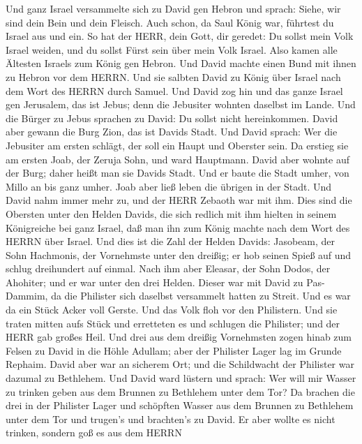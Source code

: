  Und ganz Israel versammelte sich zu David gen Hebron und
sprach: Siehe, wir sind dein Bein und dein Fleisch.  Auch
schon, da Saul König war, führtest du Israel aus und ein. So hat der
HERR, dein Gott, dir geredet: Du sollst mein Volk Israel weiden, und du
sollst Fürst sein über mein Volk Israel.  Also kamen alle
Ältesten Israels zum König gen Hebron. Und David machte einen Bund mit
ihnen zu Hebron vor dem HERRN. Und sie salbten David zu König über
Israel nach dem Wort des HERRN durch Samuel.  Und David zog
hin und das ganze Israel gen Jerusalem, das ist Jebus; denn die
Jebusiter wohnten daselbst im Lande.  Und die Bürger zu
Jebus sprachen zu David: Du sollst nicht hereinkommen. David aber gewann
die Burg Zion, das ist Davids Stadt.  Und David sprach: Wer
die Jebusiter am ersten schlägt, der soll ein Haupt und Oberster sein.
Da erstieg sie am ersten Joab, der Zeruja Sohn, und ward Hauptmann.
 David aber wohnte auf der Burg; daher heißt man sie Davids
Stadt.  Und er baute die Stadt umher, von Millo an bis ganz
umher. Joab aber ließ leben die übrigen in der Stadt.  Und
David nahm immer mehr zu, und der HERR Zebaoth war mit ihm.
 Dies sind die Obersten unter den Helden Davids, die sich
redlich mit ihm hielten in seinem Königreiche bei ganz Israel, daß man
ihn zum König machte nach dem Wort des HERRN über Israel. 
Und dies ist die Zahl der Helden Davids: Jasobeam, der Sohn Hachmonis,
der Vornehmste unter den dreißig; er hob seinen Spieß auf und schlug
dreihundert auf einmal.  Nach ihm aber Eleasar, der Sohn
Dodos, der Ahohiter; und er war unter den drei Helden. 
Dieser war mit David zu Pas-Dammim, da die Philister sich daselbst
versammelt hatten zu Streit. Und es war da ein Stück Acker voll Gerste.
Und das Volk floh vor den Philistern.  Und sie traten
mitten aufs Stück und erretteten es und schlugen die Philister; und der
HERR gab großes Heil.  Und drei aus dem dreißig Vornehmsten
zogen hinab zum Felsen zu David in die Höhle Adullam; aber der Philister
Lager lag im Grunde Rephaim.  David aber war an sicherem
Ort; und die Schildwacht der Philister war dazumal zu Bethlehem.
 Und David ward lüstern und sprach: Wer will mir Wasser zu
trinken geben aus dem Brunnen zu Bethlehem unter dem Tor? 
Da brachen die drei in der Philister Lager und schöpften Wasser aus dem
Brunnen zu Bethlehem unter dem Tor und trugen's und brachten's zu David.
Er aber wollte es nicht trinken, sondern goß es aus dem HERRN
